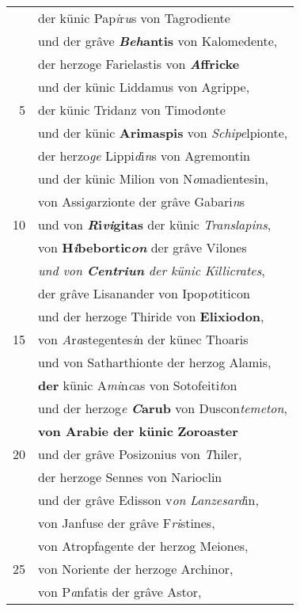 \documentclass[8pt,a4paper,notitlepage]{article}
\begin{document}
\begin{table}[ht]
\begin{minipage}[t]{0.5\linewidth}
\begin{tabular}{rl}
 & der künic Pap\textit{i}r\textit{u}s von Tagrodiente\\ 
 & und der grâve \textbf{\textit{Beh}antis} von Kalomedente,\\ 
 & der herzoge Farielastis von \textbf{\textit{A}ffricke}\\ 
 & und der künic Liddamus von Agrippe,\\ 
5 & der künic Tridanz von Timod\textit{o}nte\\ 
 & und der künic \textbf{Arimaspis} von \textit{Schipe}lpionte,\\ 
 & der herzo\textit{ge} Lippi\textit{d}i\textit{n}s von Agremontin\\ 
 & und der künic Milion von N\textit{o}madientesin,\\ 
 & von Assi\textit{g}arzionte der grâve Gabari\textit{n}s\\ 
10 & und von \textbf{\textit{R}i\textit{vi}gitas} der künic \textit{Translapins},\\ 
 & von \textbf{H\textit{i}bebortic\textit{on}} der grâve Vilones\\ 
 & \textit{und von \textbf{Centriun} der künic Killicrates},\\ 
 & der grâve Lisanander von Ipop\textit{o}titicon\\ 
 & und der herzoge Thiride von \textbf{Elixiodon},\\ 
15 & von \textit{A}r\textit{a}stegentes\textit{i}n der künec Thoaris\\ 
 & und von Satharthionte der herzog Alamis,\\ 
 & \textbf{der} künic A\textit{mi}n\textit{c}as von Sotofeiti\textit{t}on\\ 
 & und der herzog\textit{e} \textbf{\textit{C}arub} von Duscon\textit{temeton},\\ 
 & \textbf{von Arabie der künic} \textbf{Zoroaster}\\ 
20 & und der grâve Posizonius von \textit{T}hiler,\\ 
 & der herzoge Sennes von Narioclin\\ 
 & und der grâve Edisson v\textit{on} \textit{Lanzesard}in,\\ 
 & von Janfuse der grâve F\textit{ri}stines,\\ 
 & von Atropfagente der herzog Meiones,\\ 
25 & von Noriente der herzoge Archinor,\\ 
 & von P\textit{a}nfatis der grâve Astor,\\ 

\end{tabular}
\end{minipage}
\end{table}
\end{document}
